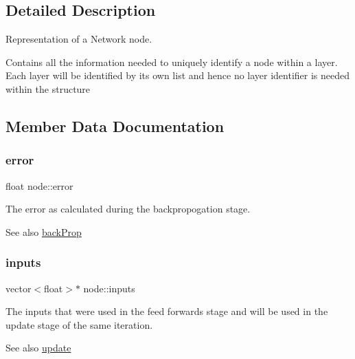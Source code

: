 \subsection{Detailed Description}
Representation of a Network node. 

Contains all the information needed to uniquely identify a node within a layer. Each layer will be identified by it\textquotesingle{}s own list and hence no layer identifier is needed within the structure 

\subsection{Member Data Documentation}
\hypertarget{structnode_a3e5a0f865fedde6b380007420c5f5e0d}{}\label{structnode_a3e5a0f865fedde6b380007420c5f5e0d} 
\subsubsection{\texorpdfstring{error}{error}}
{\footnotesize\ttfamily float node\+::error}



The error as calculated during the backpropogation stage. 

\begin{DoxySeeAlso}{See also}
\hyperlink{network_8hpp_a7155df24bb8efb6d0b5881a494e1da04}{back\+Prop} 
\end{DoxySeeAlso}
\hypertarget{structnode_a86d96e3a79362efaad880cbf8ab1bc82}{}\label{structnode_a86d96e3a79362efaad880cbf8ab1bc82} 
\subsubsection{\texorpdfstring{inputs}{inputs}}
{\footnotesize\ttfamily vector$<$float$>$$\ast$ node\+::inputs}



The inputs that were used in the feed forwards stage and will be used in the update stage of the same iteration. 

\begin{DoxySeeAlso}{See also}
\hyperlink{network_8hpp_a090940f06a6c4b23d03afca1d8b2cf10}{update} 
\end{DoxySeeAlso}
\hypertarget{structnode_a75af99a1fe4193c4ba2e85ba767a859d}{}\label{structnode_a75af99a1fe4193c4ba2e85ba767a859d} 
